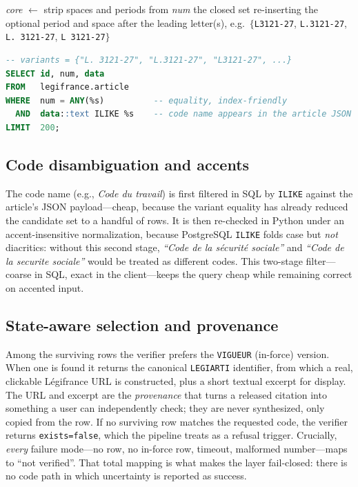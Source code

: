\begin{algorithm}[t]
\caption{Variant expansion: turn one written citation number into a closed set
of exact strings for index-friendly equality matching.}
\label{alg:variants}
\begin{algorithmic}[1]
  \State \textit{core} $\gets$ strip spaces and periods from \textit{num}
  \State \Return the closed set re-inserting the optional period and space
         after the leading letter(s), e.g.\ $\{$\texttt{L3121-27},
         \texttt{L.3121-27}, \texttt{L. 3121-27}, \texttt{L 3121-27}$\}$
\EndFunction
\end{algorithmic}
\end{algorithm}

\begin{lstlisting}[style=lr, language=SQL]
-- variants = {"L. 3121-27", "L.3121-27", "L3121-27", ...}
SELECT id, num, data
FROM   legifrance.article
WHERE  num = ANY(%s)          -- equality, index-friendly
  AND  data::text ILIKE %s    -- code name appears in the article JSON
LIMIT  200;
\end{lstlisting}

\subsection{Code disambiguation and accents}
The code name (e.g., \emph{Code du travail}) is first filtered in SQL by
\texttt{ILIKE} against the article's JSON payload---cheap, because the variant
equality has already reduced the candidate set to a handful of rows. It is then
re-checked in Python under an accent-insensitive normalization, because
PostgreSQL \texttt{ILIKE} folds case but \emph{not} diacritics: without this
second stage, \emph{``Code de la s\'ecurit\'e sociale''} and \emph{``Code de la
securite sociale''} would be treated as different codes. This two-stage
filter---coarse in SQL, exact in the client---keeps the query cheap while
remaining correct on accented input.

\subsection{State-aware selection and provenance}
Among the surviving rows the verifier prefers the \texttt{VIGUEUR} (in-force)
version. When one is found it returns the canonical \texttt{LEGIARTI}
identifier, from which a real, clickable L\'egifrance URL is constructed, plus
a short textual excerpt for display. The URL and excerpt are the
\emph{provenance} that turns a released citation into something a user can
independently check; they are never synthesized, only copied from the row. If
no surviving row matches the requested code, the verifier returns
\texttt{exists=false}, which the pipeline treats as a refusal trigger.
Crucially, \emph{every} failure mode---no row, no in-force row, timeout,
malformed number---maps to ``not verified''. That total mapping is what makes
the layer fail-closed: there is no code path in which uncertainty is reported
as success.

